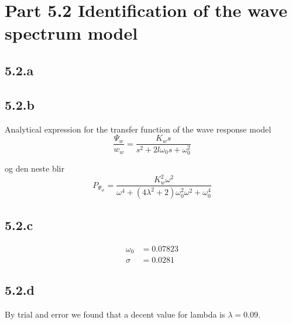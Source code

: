 \newcommand{\texMacro}[2]{\texttt{\textbackslash{#1}\{#2\}}}
\section{Part 5.2 Identification of the wave spectrum model}
\subsection{5.2.a}

\subsection{5.2.b}
Analytical expression for the transfer function of the wave response model
$$\frac{\Psi_w}{w_w} = \frac{K_ws}{s^2+2l\omega_0s+\omega_0^2}$$

og den neste blir
$$P_{\Psi_{w}} = \frac{K_w^2\omega^2}{\omega^4+(4\lambda^2+2)\omega_0^2\omega^2+\omega_0^4}$$

\subsection{5.2.c}

\begin{align*}
    \omega_0 &= 0.07823\\
    \sigma &= 0.0281
\end{align*}

\subsection{5.2.d}
By trial and error we found that a decent value for lambda is $\lambda = 0.09$.
